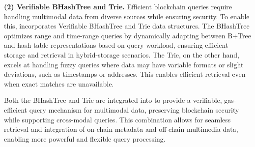 \textbf{(2) Verifiable BHashTree and Trie.}  
Efficient blockchain queries require handling multimodal data from diverse sources while ensuring security. To enable this, \Chain incorporates Verifiable BHashTree and Trie data structures. The BHashTree optimizes range and time-range queries by dynamically adapting between B+Tree and hash table representations based on query workload, ensuring efficient storage and retrieval in hybrid-storage scenarios. The Trie, on the other hand, excels at handling fuzzy queries where data may have variable formats or slight deviations, such as timestamps or addresses. This enables efficient retrieval even when exact matches are unavailable.


Both the BHashTree and Trie are integrated into \Chain to provide a verifiable, gas-efficient query mechanism for multimodal data, preserving blockchain security while supporting cross-modal queries. This combination allows for seamless retrieval and integration of on-chain metadata and off-chain multimedia data, enabling more powerful and flexible query processing. 